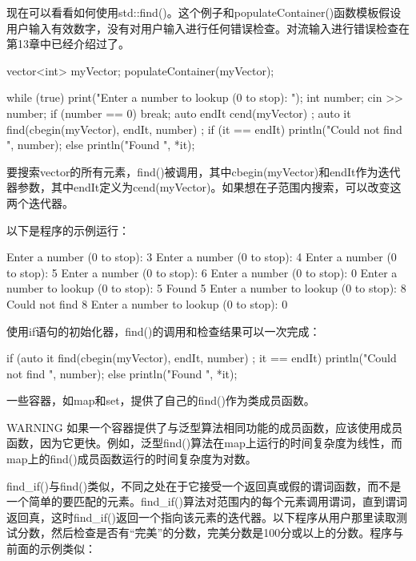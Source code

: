 现在可以看看如何使用std::find()。这个例子和populateContainer()函数模板假设用户输入有效数字，没有对用户输入进行任何错误检查。对流输入进行错误检查在第13章中已经介绍过了。

\begin{cpp}
vector<int> myVector;
populateContainer(myVector);

while (true) {
    print("Enter a number to lookup (0 to stop): ");
    int number;
    cin >> number;
    if (number == 0) { break; }
    auto endIt { cend(myVector) };
    auto it { find(cbegin(myVector), endIt, number) };
    if (it == endIt) {
        println("Could not find {}", number);
    } else {
        println("Found {}", *it);
    }
}
\end{cpp}

要搜索vector的所有元素，find()被调用，其中cbegin(myVector)和endIt作为迭代器参数，其中endIt定义为cend(myVector)。如果想在子范围内搜索，可以改变这两个迭代器。

以下是程序的示例运行：

\begin{shell}
Enter a number (0 to stop): 3
Enter a number (0 to stop): 4
Enter a number (0 to stop): 5
Enter a number (0 to stop): 6
Enter a number (0 to stop): 0
Enter a number to lookup (0 to stop): 5
Found 5
Enter a number to lookup (0 to stop): 8
Could not find 8
Enter a number to lookup (0 to stop): 0
\end{shell}

使用if语句的初始化器，find()的调用和检查结果可以一次完成：

\begin{cpp}
if (auto it { find(cbegin(myVector), endIt, number) }; it == endIt) {
    println("Could not find {}", number);
} else {
    println("Found {}", *it);
}
\end{cpp}

一些容器，如map和set，提供了自己的find()作为类成员函数。

\begin{myWarning}{WARNING}
如果一个容器提供了与泛型算法相同功能的成员函数，应该使用成员函数，因为它更快。例如，泛型find()算法在map上运行的时间复杂度为线性，而map上的find()成员函数运行的时间复杂度为对数。
\end{myWarning}

find\_if()与find()类似，不同之处在于它接受一个返回真或假的谓词函数，而不是一个简单的要匹配的元素。find\_if()算法对范围内的每个元素调用谓词，直到谓词返回真，这时find\_if()返回一个指向该元素的迭代器。以下程序从用户那里读取测试分数，然后检查是否有“完美”的分数，完美分数是100分或以上的分数。程序与前面的示例类似：


